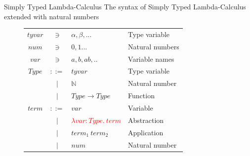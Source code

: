 \documentclass[pdf]{beamer}
\newcommand{\code}[1]{\textcolor{Red}{\textsf{#1}}}
\begin{document}
\begin{frame}{Simply Typed Lambda-Calculus}
The syntax of Simply Typed Lambda-Calculus extended with natural numbers
  \begin{figure}[H]
    \centering
    \begin{tabular}{c c l l}
      $tyvar$ & $\ni$   & $\alpha, \beta, ...$  & Type variable \\
      $num$   & $\ni$   & $0,1 ...$    & Natural numbers \\
      $var$   & $\ni$   & $a,b,ab,..$  & Variable names  \\

      $Type$  & $::=$ & $tyvar$        & Type variable \\
              & $|$   & $\mathbb{N}$            & Natural number \\
              & $|$   & $Type \to Type$  & Function       \\

      $term$  & $::=$ & $var$                          & Variable   \\
              & $|$   & \code{$\lambda var : Type. \: term$} & Abstraction \\
              & $|$   & $term_1 \: term_{2}$           & Application   \\
              & $|$   & $num$                         & Natural number \\
    \end{tabular}

  \end{figure}

\end{frame}
\end{document}
